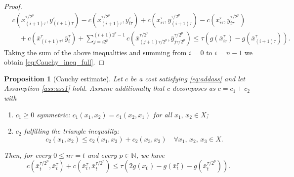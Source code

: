 \documentclass[reqno]{amsart}
\newcounter{results}[section]
\theoremstyle{plain}
\newtheorem{proposition}[results]{Proposition}
\theoremstyle{remark}
\theoremstyle{plain}
\numberwithin{equation}{section}
\theoremstyle{remark}
\newcommand{\N}{\mathbb{N}}
\begin{document}
\begin{proof}
\begin{align*}
    &c(\bar{x}_{(i+1)\tau}^{\tau/2^p},\bar{y}_{(i+1)\tau}^\tau)- c(\bar{x}_{(i+1)\tau}^{\tau/2^p},\bar{y}_{i\tau}^\tau) + c(\bar{x}_{i\tau}^\tau,\bar{y}_{(i+1)\tau}^{\tau/2^p})-c(\bar{x}_{i\tau}^\tau,\bar{y}_{i\tau}^{\tau/2^p})\\
    &\quad +c(\bar{x}_{(i+1)\tau}^\tau, \bar{y}_i^\tau)+\sum_{j=i2^p}^{(i+1)2^p-1}c(\bar{x}_{(j+1)\tau/2^p}^{\tau/2^p}, \bar{y}_{j\tau/2^p}^{\tau/2^p}) \le \tau(g(\bar{x}_{i\tau}^\tau)-g(\bar{x}_{(i+1)\tau}^\tau)).
\end{align*}
 Taking the sum of   the above inequalities and  summing  from $i=0$ to $i=n-1$  we obtain \eqref{eq:Cauchy_ineq_full}.
\end{proof}

\begin{proposition}[Cauchy estimate]\label{prop:cauchy}  Let $c$ be a cost satisfying \eqref{eq:addass}  and let  Assumption \ref{ass:ass1} hold. Assume additionally  that $c$     decomposes as $c=c_1+c_2$ with 
\begin{enumerate}
    \item  $c_1\geq 0$  symmetric: $c_1(x_1,x_2)=c_1(x_2,x_1)$ for all $x_1,\, x_2 \in X$;  
    \item $c_2$ fulfilling the triangle inequality: $$c_2(x_1,x_2)\leq c_2(x_1,x_3)+ c_2(x_3,x_2)\quad \forall x_1,\, x_2, \, x_3 \in X.$$  
\end{enumerate}
Then, for every $0 \le n \tau = t$ and every $p \in \N$, we have
\[ c(\bar{x}_{t}^{\tau/2^p},\bar{x}_{t}^\tau)+c(\bar{x}_{t}^\tau,\bar{x}_{t}^{\tau/2^p}) \le \tau(2g(x_0)-g(\bar{x}_{t}^\tau)-g(\bar{x}_{t}^{\tau/2^p})).\]
    
\end{proposition}
\end{document}
